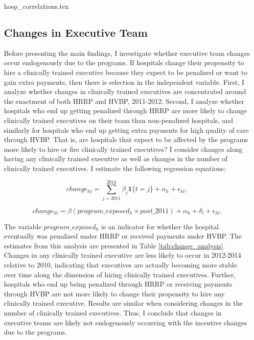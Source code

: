 \documentclass[12pt]{article}
\begin{document}
    {hosp_correlations.tex}

    \subsection{Changes in Executive Team}\label{sec:endog}

    Before presenting the main findings, I investigate whether executive team changes occur endogenously due to the programs. If hospitals change their propensity to hire a clinically trained executive because they expect to be penalized or want to gain extra payments, then there is selection in the independent variable. First, I analyze whether changes in clinically trained executives are concentrated around the enactment of both HRRP and HVBP, 2011-2012. Second, I analyze whether hospitals who end up getting penalized through HRRP are more likely to change clinically trained executives on their team than non-penalized hospitals, and similarly for hospitals who end up getting extra payments for high quality of care through HVBP. That is, are hospitals that expect to be affected by the programs more likely to hire or fire clinically trained executives? I consider changes along having any clinically trained executive as well as changes in the number of clinically trained executives. I estimate the following regression equations:

    \begin{equation}\label{eq:change1}
    change_{ht} = \sum_{j=2011}^{2014}\beta_j\mathbf{1}\{t=j\} + \alpha_h + \epsilon_{ht},
    \end{equation}

    \begin{equation}\label{eq:change2}
    change_{ht} = \beta(program\_exposed_{h} \times post\_2011)+ \alpha_h + \delta_t + \epsilon_{ht}.
    \end{equation}

    The variable $program\_exposed_{h}$ is an indicator for whether the hospital eventually was penalized under HRRP or received payments under HVBP. The estimates from this analysis are presented in Table \ref{tab:change_analysis}. Changes in any clinically trained executive are less likely to occur in 2012-2014 relative to 2010, indicating that executives are actually becoming more stable over time along the dimension of hiring clinically trained executives. Further, hospitals who end up being penalized through HRRP or receiving payments through HVBP are not more likely to change their propensity to hire any clinically trained executive. Results are similar when considering changes in the number of clinically trained executives. Thus, I conclude that changes in executive teams are likely not endogenously occurring with the incentive changes due to the programs. 
\end{document}
